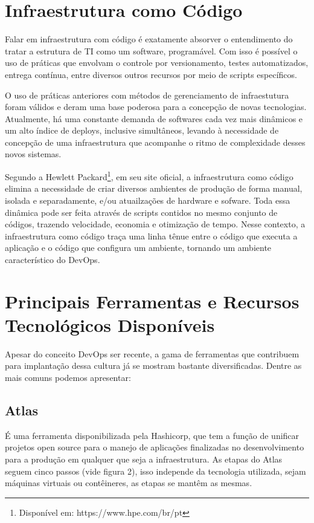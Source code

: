 \section{Infraestrutura como Código}
Falar em infraestrutura com código é exatamente absorver o entendimento do tratar a estrutura de TI como um software, programável. Com isso é possível o uso de práticas que envolvam o controle por versionamento, testes automatizados, entrega contínua, entre diversos outros recursos por meio de scripts específicos.

O uso de práticas anteriores com métodos de gerenciamento de infraestutura foram válidos e deram uma base poderosa para a concepção de novas tecnologias. Atualmente, há  uma constante demanda de softwares cada vez mais dinâmicos e um alto índice de deploys, inclusive simultâneos, levando à necessidade de concepção de uma infraestrutura que acompanhe o ritmo de complexidade desses novos sistemas.

Segundo a Hewlett Packard\footnote{Disponível em: https://www.hpe.com/br/pt}, em seu site oficial, a infraestrutura como código elimina a necessidade de criar diversos ambientes de produção de forma manual, isolada e separadamente, e/ou atuailzações de hardware e sofware. Toda essa dinâmica pode ser feita através de scripts contidos no mesmo conjunto de códigos, trazendo velocidade, economia e otimização de tempo. Nesse contexto, a infraestrutura como código traça uma linha tênue entre o código que executa a aplicação e o código que configura um ambiente, tornando um ambiente característico do DevOps.


\section{Principais Ferramentas e Recursos Tecnológicos Disponíveis}
Apesar do conceito DevOps ser recente, a gama de ferramentas que contribuem para implantação dessa cultura já se mostram bastante diversificadas. Dentre as mais comuns podemos apresentar:

\subsection{Atlas}
É uma ferramenta disponibilizada pela Hashicorp, que tem a função de unificar projetos open source para o manejo de aplicações finalizadas no desenvolvimento para a produção em qualquer que seja a infraestrutura.
As etapas do Atlas seguem cinco passos (vide figura 2), isso independe da tecnologia utilizada, sejam máquinas virtuais ou contêineres, as etapas se mantêm as mesmas. \cite{hashimoto}

